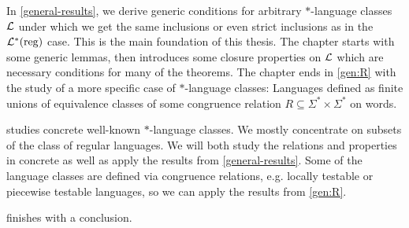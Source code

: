 In \cref{general-results}, we derive generic conditions for arbitrary $*$-language classes $\mathcal{L}$ under which we get the same inclusions or even strict inclusions as in the $\mathcal{L}^*(\textup{\textrm{reg}})$ case. This is the main foundation of this thesis. The chapter starts with some generic lemmas, then introduces some closure properties on $\mathcal{L}$ which are necessary conditions for many of the theorems. The chapter ends in \cref{gen:R} with the study of a more specific case of $*$-language classes: Languages defined as finite unions of equivalence classes of some congruence relation $R \subseteq \Sigma^*\times\Sigma^*$ on words.

 studies concrete well-known $*$-language classes. We mostly concentrate on subsets of the class of regular languages. We will both study the relations and properties in concrete as well as apply the results from \cref{general-results}. Some of the language classes are defined via congruence relations, e.g. locally testable or piecewise testable languages, so we can apply the results from \cref{gen:R}.

 finishes with a conclusion.
